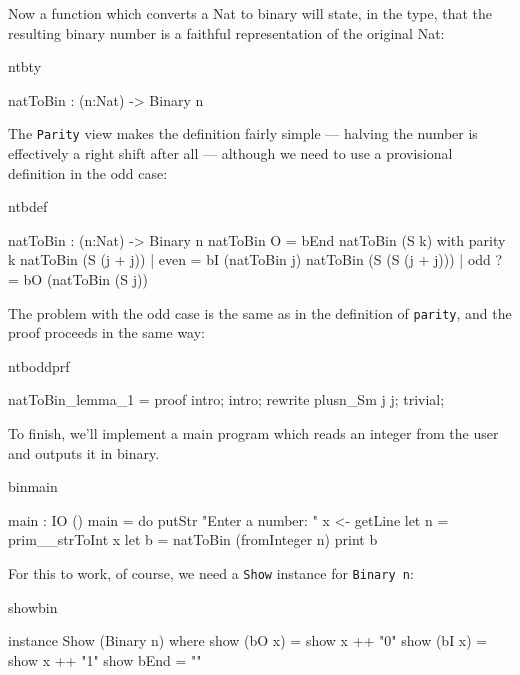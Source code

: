 Now a function which converts a Nat to binary will state, in the type, that the
resulting binary number is a faithful representation of the original Nat:

\begin{SaveVerbatim}{ntbty}

natToBin : (n:Nat) -> Binary n

\end{SaveVerbatim}

\noindent
The \texttt{Parity} view makes the definition fairly simple --- halving the
number is effectively a right shift after all --- although we need to use a
provisional definition in the odd case:

\begin{SaveVerbatim}{ntbdef}

natToBin : (n:Nat) -> Binary n
natToBin O = bEnd
natToBin (S k) with parity k {
   natToBin (S (j + j))     | even  = bI (natToBin j)
   natToBin (S (S (j + j))) | odd  ?= bO (natToBin (S j))
}

\end{SaveVerbatim}

\noindent
The problem with the odd case is the same as in the definition of \texttt{parity}, and
the proof proceeds in the same way:

\begin{SaveVerbatim}{ntboddprf}

natToBin_lemma_1 = proof {
    intro;
    intro;
    rewrite plusn_Sm j j;
    trivial;
}

\end{SaveVerbatim}

\noindent
To finish, we'll implement a main program which reads an integer from the user and
outputs it in binary. 

\begin{SaveVerbatim}{binmain}

main : IO ()
main = do { putStr "Enter a number: "
            x <- getLine
            let n = prim__strToInt x
            let b = natToBin (fromInteger n)
            print b 
          }

\end{SaveVerbatim}

\noindent
For this to work, of course, we need a \texttt{Show} instance for \texttt{Binary n}:

\begin{SaveVerbatim}{showbin}

instance Show (Binary n) where {
    show (bO x) = show x ++ "0"
    show (bI x) = show x ++ "1"
    show bEnd = ""
}

\end{SaveVerbatim}

